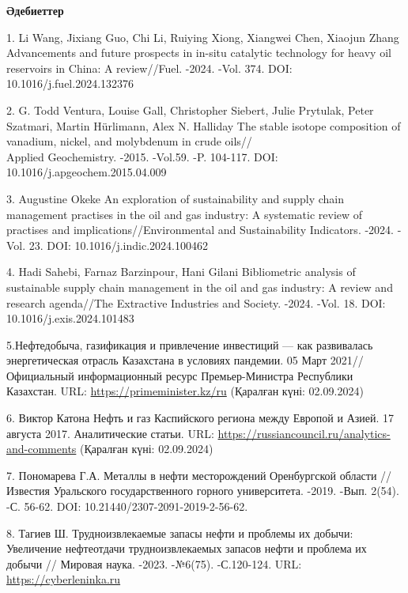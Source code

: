 \begin{center}
  {\bfseries Әдебиеттер}
  \end{center}
  \begin{references}
1. Li Wang, Jixiang Guo, Chi Li, Ruiying Xiong, Xiangwei Chen, Xiaojun
Zhang Advancements and future prospects in in-situ catalytic technology
for heavy oil reservoirs in China: A review//Fuel. -2024. -Vol. 374.
DOI: 10.1016/j.fuel.2024.132376

2. G. Todd Ventura, Louise Gall, Christopher Siebert, Julie Prytulak,
Peter Szatmari, Martin Hürlimann, Alex N. Halliday The stable isotope
composition of vanadium, nickel, and molybdenum in crude oils//\\Applied
Geochemistry. -2015. -Vol.59. -P. 104-117. DOI:
10.1016/j.apgeochem.2015.04.009

3. Augustine Okeke An exploration of sustainability and supply chain
management practises in the oil and gas industry: A systematic review of
practises and implications//Environmental and Sustainability Indicators.
-2024. -Vol. 23. DOI: 10.1016/j.indic.2024.100462

4. Hadi Sahebi, Farnaz Barzinpour, Hani Gilani Bibliometric analysis of
sustainable supply chain \linebreak management in the oil and gas industry: A
review and research agenda//The Extractive Industries and Society.
-2024. -Vol. 18. DOI: 10.1016/j.exis.2024.101483

5.Нефтедобыча, газификация и привлечение инвестиций --- как развивалась
энергетическая отрасль Казахстана в условиях пандемии. 05 Март
2021//Официальный информационный ресурс Премьер-Министра Республики
Казахстан. 
URL:
\href{https://primeminister.kz/ru/news/neftedobycha-gazifikaciya-i-privlechenie-investiciy-kak-razvivalas-energeticheskaya-otrasl-kazahstana-v-usloviyah-pandemii-52034}{https://primeminister.kz/ru}
(Қаралған күні: 02.09.2024)

6. Виктор Катона Нефть и газ Каспийского региона между Европой и Азией.
17 августа 2017. Аналитические статьи. URL:
\href{https://russiancouncil.ru/analytics-and-comments/analytics/neft-i-gaz-kaspiyskogo-regiona-mezhdu-evropoy-i-aziey/}{https://russiancouncil.ru/analytics-and-comments}
(Қаралған күні: 02.09.2024)

7. Пономарева Г.А. Металлы в нефти месторождений Оренбургской области
//Известия Уральского государственного горного университета. -2019.
-Вып. 2(54). -С. 56-62. DOI: 10.21440/2307-2091-2019-2-56-62.

8. Тагиев Ш. Трудноизвлекаемые запасы нефти и проблемы их добычи:
Увеличение нефтеотдачи трудноизвлекаемых запасов нефти и проблема их
добычи // Мировая наука. -2023. -№6(75). -С.120-124. URL:
\href{https://cyberleninka.ru/article/n/trudnoizvlekaemye-zapasy-nefti-i-problemy-ih-dobychi-uvelechenie-nefteotdachi-trudnoizvlekaemyh-zapasov-nefti-i-problema-ih-dobychi/viewer}{https://cyberleninka.ru}


\end{references}
